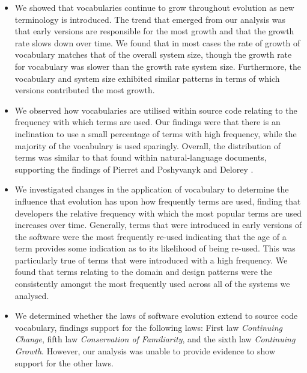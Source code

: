 \begin{itemize}
		
	\item We showed that vocabularies continue to grow throughout evolution  as new terminology is introduced. The trend that emerged from our analysis was that early versions are responsible for the most growth and that the growth rate slows down over time. We found that in most cases the rate of growth of vocabulary matches that of the overall system size, though the growth rate for vocabulary was slower than the growth rate system size. Furthermore, the vocabulary and system size exhibited similar patterns in terms of which versions contributed the most growth.

	\item We observed how vocabularies are utilised within source code relating to the frequency with which terms are used. Our findings were that there is an inclination to use a small percentage of terms with high frequency, while the majority of the vocabulary is used sparingly. Overall, the distribution of terms was similar to that found within natural-language documents, supporting the findings of Pierret and Poshyvanyk \cite{Pierret09a} and Delorey \etal \cite{Delorey09a}.

\item We investigated changes in the application of vocabulary to determine the influence that evolution has upon how frequently terms are used, finding that developers the relative frequency with which the most popular terms are used increases over time. Generally, terms that were introduced in early versions of the software were the most frequently re-used indicating that the age of a term provides some indication as to its likelihood of being re-used. This was particularly true of terms that were introduced with a high frequency. We found that terms relating to the domain and design patterns were the consistently amongst the most frequently used across all of the systems we analysed.
	
	\item We determined whether the laws of software evolution \cite{Lehman97a} extend to source code vocabulary, findings support for the following laws: First law \emph{Continuing Change}, fifth law \emph{Conservation of Familiarity}, and the sixth law \emph{Continuing Growth}. However, our analysis was unable to provide evidence to show support for the other laws.

\end{itemize}

